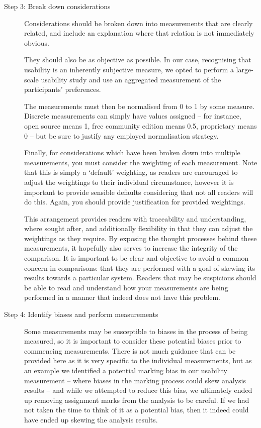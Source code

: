 \begin{description}
    \item[Step 3: Break down considerations]
      Considerations should be broken down into measurements that are clearly related, and include an explanation where that relation is not immediately obvious. 

      They should also be as objective as possible. In our case, recognising that usability is an inherently subjective measure, we opted to perform a large-scale usability study and use an aggregated measurement of the participants' preferences.

      The measurements must then be normalised from 0 to 1 by some measure. Discrete measurements can simply have values assigned -- for instance, open source means 1, free community edition means 0.5, proprietary means 0 -- but be sure to justify any employed normalisation strategy.

      Finally, for considerations which have been broken down into multiple measurements, you must consider the weighting of each measurement. Note that this is simply a `default' weighting, as readers are encouraged to adjust the weightings to their individual circumstance, however it is important to provide sensible defaults considering that not all readers will do this. Again, you should provide justification for provided weightings.

      This arrangement provides readers with traceability and understanding, where sought after, and additionally flexibility in that they can adjust the weightings as they require. By exposing the thought processes behind these measurements, it hopefully also serves to increase the integrity of the comparison. It is important to be clear and objective to avoid a common concern in comparisons: that they are performed with a goal of skewing its results towards a particular system. Readers that may be suspicious should be able to read and understand how your measurements are being performed in a manner that indeed does not have this problem.

    \item[Step 4: Identify biases and perform measurements]
      Some measurements may be susceptible to biases in the process of being measured, so it is important to consider these potential biases prior to commencing measurements. There is not much guidance that can be provided here as it is very specific to the individual measurements, but as an example we identified a potential marking bias in our usability measurement -- where biases in the marking process could skew analysis results -- and while we attempted to reduce this bias, we ultimately ended up removing assignment marks from the analysis to be careful. If we had not taken the time to think of it as a potential bias, then it indeed could have ended up skewing the analysis results.


\end{description}
